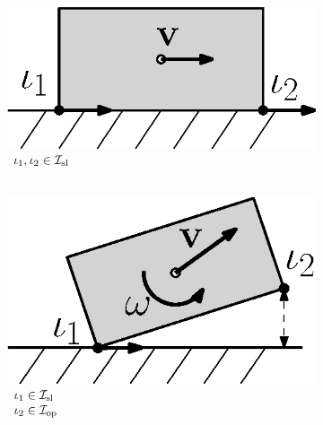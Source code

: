 \documentclass[../DC2017114Bouma.tex]{subfiles}
\begin{document}
\begin{figure}[bt!]
\begin{subfigure}[b]{0.17\textwidth}
\end{subfigure}
\quad
\begin{subfigure}[b]{0.17\textwidth}   
\centering 
\includegraphics[width=\textwidth]{example3.eps}
\caption{$\begin{array}{l}
\iota_1,\iota_2\in\mathcal{I}_{\textnormal{sl}}\\ \hspace{0cm}
\end{array}$}
\label{fig:2example3}
\end{subfigure}
\quad
\begin{subfigure}[b]{0.17\textwidth}  
\centering 
\includegraphics[width=\textwidth]{example4.eps}
\caption{$\begin{array}{l}
\iota_1\in\mathcal{I}_{\textnormal{sl}}\\\iota_2\in\mathcal{I}_{\textnormal{op}}
\end{array}$}
\label{fig:2example4}
\end{subfigure}
\quad
\begin{subfigure}[b]{0.17\textwidth}   
\centering 

\end{subfigure}
\end{figure}
\end{document}
